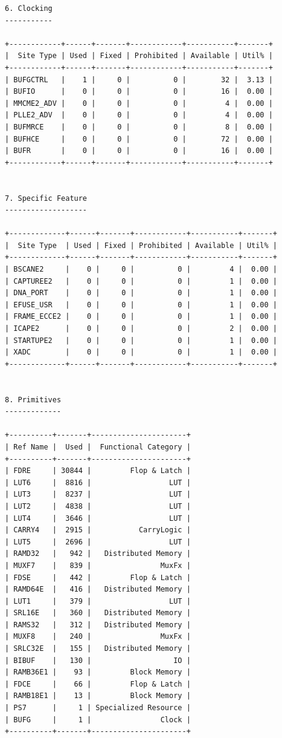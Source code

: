 \documentclass[11pt]{article}
\begin{document}
{\begin{verbatim}
6. Clocking
-----------

+------------+------+-------+------------+-----------+-------+
|  Site Type | Used | Fixed | Prohibited | Available | Util% |
+------------+------+-------+------------+-----------+-------+
| BUFGCTRL   |    1 |     0 |          0 |        32 |  3.13 |
| BUFIO      |    0 |     0 |          0 |        16 |  0.00 |
| MMCME2_ADV |    0 |     0 |          0 |         4 |  0.00 |
| PLLE2_ADV  |    0 |     0 |          0 |         4 |  0.00 |
| BUFMRCE    |    0 |     0 |          0 |         8 |  0.00 |
| BUFHCE     |    0 |     0 |          0 |        72 |  0.00 |
| BUFR       |    0 |     0 |          0 |        16 |  0.00 |
+------------+------+-------+------------+-----------+-------+


7. Specific Feature
-------------------

+-------------+------+-------+------------+-----------+-------+
|  Site Type  | Used | Fixed | Prohibited | Available | Util% |
+-------------+------+-------+------------+-----------+-------+
| BSCANE2     |    0 |     0 |          0 |         4 |  0.00 |
| CAPTUREE2   |    0 |     0 |          0 |         1 |  0.00 |
| DNA_PORT    |    0 |     0 |          0 |         1 |  0.00 |
| EFUSE_USR   |    0 |     0 |          0 |         1 |  0.00 |
| FRAME_ECCE2 |    0 |     0 |          0 |         1 |  0.00 |
| ICAPE2      |    0 |     0 |          0 |         2 |  0.00 |
| STARTUPE2   |    0 |     0 |          0 |         1 |  0.00 |
| XADC        |    0 |     0 |          0 |         1 |  0.00 |
+-------------+------+-------+------------+-----------+-------+


8. Primitives
-------------

+----------+-------+----------------------+
| Ref Name |  Used |  Functional Category |
+----------+-------+----------------------+
| FDRE     | 30844 |         Flop & Latch |
| LUT6     |  8816 |                  LUT |
| LUT3     |  8237 |                  LUT |
| LUT2     |  4838 |                  LUT |
| LUT4     |  3646 |                  LUT |
| CARRY4   |  2915 |           CarryLogic |
| LUT5     |  2696 |                  LUT |
| RAMD32   |   942 |   Distributed Memory |
| MUXF7    |   839 |                MuxFx |
| FDSE     |   442 |         Flop & Latch |
| RAMD64E  |   416 |   Distributed Memory |
| LUT1     |   379 |                  LUT |
| SRL16E   |   360 |   Distributed Memory |
| RAMS32   |   312 |   Distributed Memory |
| MUXF8    |   240 |                MuxFx |
| SRLC32E  |   155 |   Distributed Memory |
| BIBUF    |   130 |                   IO |
| RAMB36E1 |    93 |         Block Memory |
| FDCE     |    66 |         Flop & Latch |
| RAMB18E1 |    13 |         Block Memory |
| PS7      |     1 | Specialized Resource |
| BUFG     |     1 |                Clock |
+----------+-------+----------------------+



\end{verbatim}}
\end{document}
